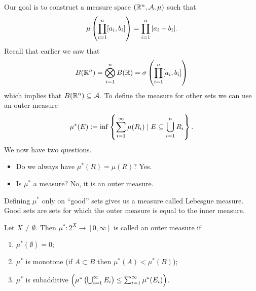 \documentclass[11pt,a4paper]{article}
\newcommand{\A}{\mathcal A}
\begin{document}
\noindent
Our goal is to construct a measure space $(\R^n, \A, \mu)$ such that
\[
  \mu\del{\prod_{i=1}^{n} [a_i,b_i]} =
  \prod_{i=1}^{n} |a_i - b_i|.
\]
Recall that earlier we saw that
\[
  B(\R^n) =
  \bigotimes_{i=1}^{n} B(\R) =
  \sigma\del{\prod_{i=1}^{n} [a_i,b_i]}
\]
which implies that $B(\R^n) \subseteq \A$.
To define the measure for other sets we can use an outer measure
\[
  \mu^*(E) := \inf \left\{\sum_{i=1}^{\infty} \mu(R_i) \mid E \subseteq 
  \bigcup_{i=1}^{n} R_i\right\}.
\]
We now have two questions.
\begin{itemize}
  \item[(1)] Do we always have $\mu^*(R) = \mu(R)$? Yes.
  \item[(2)] Is $\mu^*$ a measure? No, it is an outer measure.
\end{itemize}
\begin{remark}
  Defining $\mu^*$ only on ``good'' sets gives us a measure called
  Lebesgue measure.
  Good sets are sets for which the outer measure is equal to the inner measure.
\end{remark}

\begin{definition}
  Let $X \neq \emptyset$. Then $\mu^* \colon 2^X \to [0,\infty]$ is
  called an outer measure if
  \begin{enumerate}
    \item[(1)] $\mu^*(\emptyset) = 0$;
    \item[(2)] $\mu^*$ is monotone (if $A \subset B$ then $\mu^*(A) < \mu^*(B)$);
    \item[(3)] $\mu^*$ is subadditive
      $\del{\mu^*\del{\bigcup_{i=1}^{\infty} E_i} \le 
      \sum_{i=1}^{\infty} \mu^*(E_i)}$.
  \end{enumerate}
\end{definition}
\end{document}
